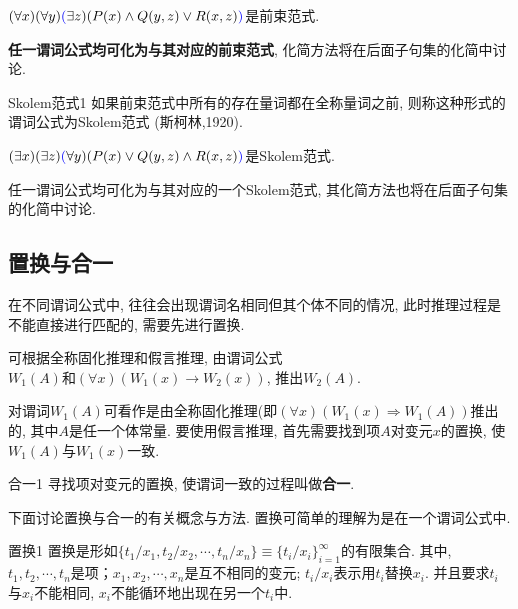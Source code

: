 \begin{example}
  $(\forall x) (\forall y) \textcolor[rgb]{0,0,1}{(}\exists z)(P(x)\wedge Q(y,z)\vee R(x,z)\textcolor[rgb]{0,0,1}{)}$是前束范式.
\end{example}

\textbf{任一谓词公式均可化为与其对应的前束范式}, 化简方法将在后面子句集的化简中讨论.

\begin{mydef}{Skolem范式}{1}
如果前束范式中所有的存在量词都在全称量词之前, 则称这种形式的谓词公式为Skolem范式 (斯柯林,1920).
\end{mydef}

\begin{example}
  $(\exists x) (\exists  z) \textcolor[rgb]{0.00,0.00,1.00}{(}\forall y)(P(x)\vee Q(y,z)\wedge R(x,z)\textcolor[rgb]{0.00,0.00,1.00}{)}$是Skolem范式.
\end{example}

任一谓词公式均可化为与其对应的一个Skolem范式, 其化简方法也将在后面子句集的化简中讨论.
\subsection{置换与合一}
在不同谓词公式中, 往往会出现谓词名相同但其个体不同的情况, 此时推理过程是不能直接进行匹配的, 需要先进行置换.

\begin{example}
可根据全称固化推理和假言推理, 由谓词公式$W_1(A) 和 (\forall x)(W_1(x)\rightarrow W_2(x))$, 推出$W_2(A)$.
\end{example}

\begin{remark}
 对谓词$W_1(A)$可看作是由全称固化推理(即$(\forall x)(W_1(x) \Rightarrow  W_1(A))$推出的, 其中$A$是任一个体常量. 要使用假言推理, 首先需要找到项$A$对变元$x$的置换, 使$W_1(A)$与$W_1(x)$一致.
\end{remark}

\begin{mydef}{合一}{1}
    寻找项对变元的置换, 使谓词一致的过程叫做\textcolor[rgb]{0,0,1}{\textbf{合一}}.
\end{mydef}

下面讨论置换与合一的有关概念与方法. 置换可简单的理解为是在一个谓词公式中.
\begin{mydef}{置换}{1}
置换是形如$\{t_1/x_1,t_2/x_2,\cdots,t_n/x_n\}\equiv \{t_i/x_i\}_{i=1}^{\infty}$的有限集合. 其中, $t_1,t_2,\cdots,t_n$是项；$x_1,x_2,\cdots,x_n$是互不相同的变元;
$t_i/x_i$表示用$t_i$替换$x_i$. 并且要求$t_i$与$x_i$不能相同, $x_i$不能循环地出现在另一个$t_i$中.
\end{mydef}

